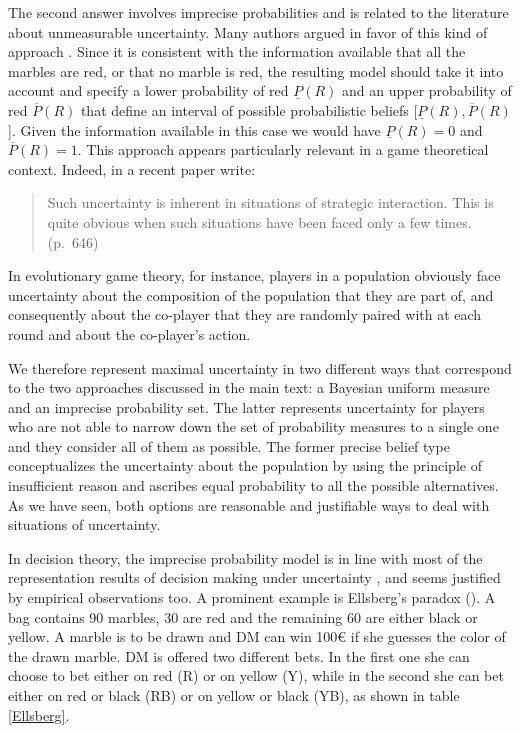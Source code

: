 \documentclass[fleqn,reqno,12pt]{article}
\theoremstyle{Satz}
\theoremstyle{Bsp}
\begin{document}
The second answer involves imprecise probabilities and is related to the literature about
unmeasurable uncertainty. Many authors argued in favor of this kind of approach
\citep[e.g.,][]{levi74,gardsah82,walley96}. Since it is consistent with the information
available that all the marbles are red, or that no marble is red, the resulting model should
take it into account and specify a lower probability of red $\underline{P}(R)$ and an upper
probability of red $\overline{P}(R)$ that define an interval of possible probabilistic beliefs
[$\underline{P}(R), \overline{P}(R)$]. Given the information available in this case we would
have $\underline{P}(R)=0$ and $\overline{P}(R)=1$. This approach appears particularly relevant
in a game theoretical context. Indeed, in a recent paper \citet{BattCerrMM15} write:

\begin{quote}
  Such uncertainty is inherent in situations of strategic interaction. This is quite obvious
  when such situations have been faced only a few times. (p.~646)
\end{quote}

\noindent In evolutionary game theory, for instance, players in a population obviously face
uncertainty about the composition of the population that they are part of, and consequently
about the co-player that they are randomly paired with at each round and about the co-player's
action. 

We therefore represent maximal uncertainty in two different ways that correspond to the two
approaches discussed in the main text: a Bayesian uniform measure and an imprecise probability
set. The latter represents uncertainty for players who are not able to narrow down the set of
probability measures to a single one and they consider all of them as possible. The former
precise belief type conceptualizes the uncertainty about the population by using the principle
of insufficient reason and ascribes equal probability to all the possible alternatives. As we
have seen, both options are reasonable and justifiable ways to deal with situations of
uncertainty.

In decision theory, the imprecise probability model is in line with most of the representation
results of decision making under uncertainty \citep[e.g.,][]{gilsch89,KlibMarMuk05,GhirMar02},
and seems justified by empirical observations too. A prominent example is Ellsberg's paradox
(\citet{ells61}). A bag contains 90 marbles, 30 are red and the remaining 60 are either black
or yellow. A marble is to be drawn and DM can win 100€ if she guesses the color of the drawn
marble. DM is offered two different bets. In the first one she can choose to bet either on
red (R) or on yellow (Y), while in the second she can bet either on red or black (RB) or on
yellow or black (YB), as shown in table \ref{Ellsberg}.
\end{document}
